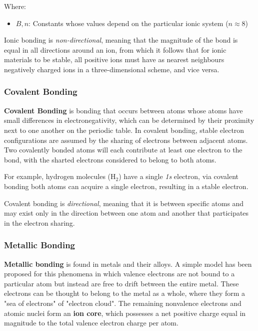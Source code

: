\documentclass{article}
\begin{document}
Where:

\begin{itemize}
    \item $B,n$: Constants whose values depend on the particular ionic system ($n \approx 8$)
\end{itemize}

Ionic bonding is \textit{non-directional}, meaning that the magnitude of the bond is equal in all directions around an ion, from which it follows that for ionic materials to be stable, all positive ions must have as nearest neighbours negatively charged ions in a three-dimensional scheme, and vice versa.

\subsubsection{Covalent Bonding}

\textbf{Covalent Bonding} is bonding that occurs between atoms whose atoms have small differences in electronegativity, which can be determined by their proximity next to one another on the periodic table. In covalent bonding, stable electron configurations are assumed by the sharing of electrons between adjacent atoms. Two covalently bonded atoms will each contribute at least one electron to the bond, with the sharted electrons considered to belong to both atoms.

For example, hydrogen molecules ($\text{H}_2$) have a single \textit{1s} electron, via covalent bonding both atoms can acquire a single electron, resulting in a stable electron. 

Covalent bonding is \textit{directional}, meaning that it is between specific atoms and may exist only in the direction between one atom and another that participates in the electron sharing.

\subsubsection{Metallic Bonding}

\textbf{Metallic bonding} is found in metals and their alloys. A simple model has been proposed for this phenomena in which valence electrons are not bound to a particular atom but instead are free to drift between the entire metal. These electrons can be thought to belong to the metal as a whole, where they form a "sea of electrons" of "electron cloud". The remaining nonvalence electrons and atomic nuclei form an \textbf{ion core}, which possesses a net positive charge equal in magnitude to the total valence electron charge per atom. 
\end{document}
